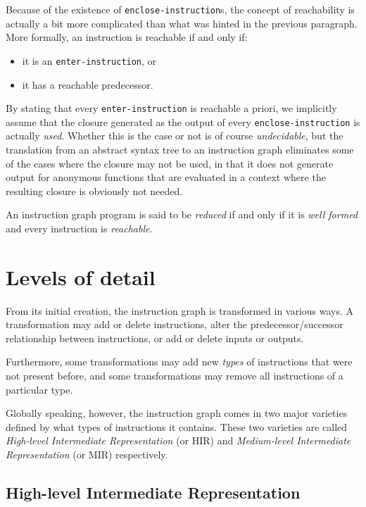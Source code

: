 Because of the existence of \texttt{enclose-instruction}s, the concept
of reachability is actually a bit more complicated than what was
hinted in the previous paragraph.  More formally, an instruction is
reachable if and only if:

\begin{itemize}
\item it is an \texttt{enter-instruction}, or
\item it has a reachable predecessor.
\end{itemize}

By stating that every \texttt{enter-instruction} is reachable a
priori, we implicitly assume that the closure generated as the output
of every \texttt{enclose-instruction} is actually \emph{used}.
Whether this is the case or not is of course \emph{undecidable}, but
the translation from an abstract syntax tree to an instruction graph
eliminates some of the cases where the closure may not be used, in
that it does not generate output for anonymous functions that are
evaluated in a context where the resulting closure is obviously not
needed.

An instruction graph program is said to be \emph{reduced} if and only
if it is \emph{well formed} and every instruction is \emph{reachable}.

\section{Levels of detail}

From its initial creation, the instruction graph is transformed in
various ways.  A transformation may add or delete instructions, alter
the predecessor/successor relationship between instructions, or add or
delete inputs or outputs.

Furthermore, some transformations may add new \emph{types} of
instructions that were not present before, and some transformations
may remove all instructions of a particular type.

Globally speaking, however, the instruction graph comes in two major
varieties defined by what types of instructions it contains.  These
two varieties are called \emph{High-level Intermediate Representation}
(or HIR) and \emph{Medium-level Intermediate Representation} (or MIR)
respectively.

\subsection{High-level Intermediate Representation}

